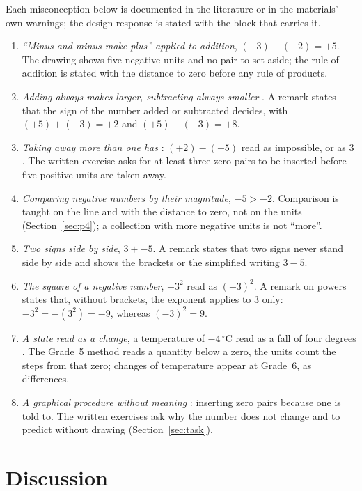\documentclass[11pt,a4paper]{article}
\theoremstyle{definition}
\begin{document}
Each misconception below is documented in the literature or in the materials' own warnings; the design response is stated with the block that carries it.

\begin{enumerate}[leftmargin=*]
\item \emph{``Minus and minus make plus'' applied to addition}, $(-3)+(-2)=+5$. The drawing shows five negative units and no pair to set aside; the rule of addition is stated with the distance to zero before any rule of products.
\item \emph{Adding always makes larger, subtracting always smaller} \citep{Bishop2014}. A remark states that the sign of the number added or subtracted decides, with $(+5)+(-3)=+2$ and $(+5)-(-3)=+8$.
\item \emph{Taking away more than one has} \citep{Bishop2014}: $(+2)-(+5)$ read as impossible, or as $3$. The written exercise asks for at least three zero pairs to be inserted before five positive units are taken away.
\item \emph{Comparing negative numbers by their magnitude}, $-5>-2$. Comparison is taught on the line and with the distance to zero, not on the units (Section~\ref{sec:p4}); a collection with more negative units is not ``more''.
\item \emph{Two signs side by side}, $3+-5$. A remark states that two signs never stand side by side and shows the brackets or the simplified writing $3-5$.
\item \emph{The square of a negative number}, $-3^2$ read as $(-3)^2$. A remark on powers states that, without brackets, the exponent applies to $3$ only: $-3^2=-(3^2)=-9$, whereas $(-3)^2=9$.
\item \emph{A state read as a change}, a temperature of $-4\,^\circ$C read as a fall of four degrees \citep{Vergnaud1982}. The Grade~5 method reads a quantity below a zero, the units count the steps from that zero; changes of temperature appear at Grade~6, as differences.
\item \emph{A graphical procedure without meaning} \citep{Vig2014}: inserting zero pairs because one is told to. The written exercises ask why the number does not change and to predict without drawing (Section~\ref{sec:task}).
\end{enumerate}

\section{Discussion}\label{sec:discussion}
\end{document}
